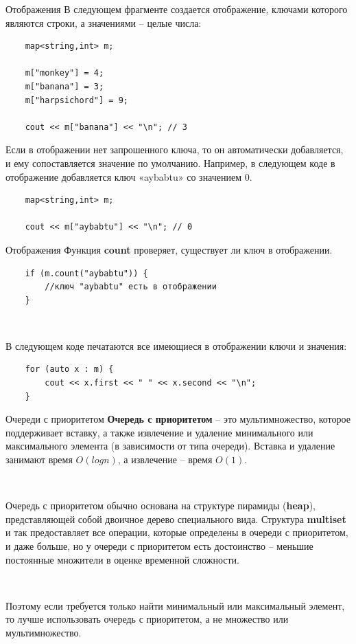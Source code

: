 \documentclass{beamer}
\begin{document}
\begin{frame}[fragile]{Отображения}
    В следующем фрагменте создается отображение, ключами которого являются строки, а значениями – целые числа:
    \begin{verbatim}
    map<string,int> m;
    
    m["monkey"] = 4;
    m["banana"] = 3;
    m["harpsichord"] = 9;
    
    cout << m["banana"] << "\n"; // 3
    \end{verbatim}
    
    Если в отображении нет запрошенного ключа, то он автоматически добавляется, и ему сопоставляется значение по умолчанию. Например, в следующем коде в отображение добавляется ключ «aybabtu» со значением 0.
    \begin{verbatim}
    map<string,int> m;
    
    cout << m["aybabtu"] << "\n"; // 0
    \end{verbatim}
\end{frame}

\begin{frame}[fragile]{Отображения}
    Функция \textbf{count} проверяет, существует ли ключ в отображении. 
    \begin{verbatim}
    if (m.count("aybabtu")) {
        //ключ "aybabtu" есть в отображении
    }
    \end{verbatim}
    
    ~
    
    В следующем коде печатаются все имеющиеся в отображении ключи и
значения:
    \begin{verbatim}
    for (auto x : m) {
        cout << x.first << " " << x.second << "\n";
    }
    \end{verbatim}
\end{frame}

\begin{frame}[fragile]{Очереди с приоритетом}
    \textbf{Очередь с приоритетом} -- это мультимножество, которое поддерживает вставку, а также извлечение и удаление минимального или максимального элемента (в зависимости от типа очереди). Вставка и удаление занимают время $O(log n)$, а извлечение – время $O(1)$.
    
    ~
    
    Очередь с приоритетом обычно основана на структуре пирамиды (\textbf{heap}), представляющей собой двоичное дерево специального вида. Структура \textbf{multiset} и так предоставляет все операции, которые определены в очереди с приоритетом, и даже больше, но у очереди с приоритетом есть достоинство -- меньшие постоянные множители в оценке временной сложности.
    
    ~
    
    Поэтому если требуется только найти минимальный или максимальный элемент, то лучше использовать очередь с приоритетом, а не множество или мультимножество.
\end{frame}
\end{document}
